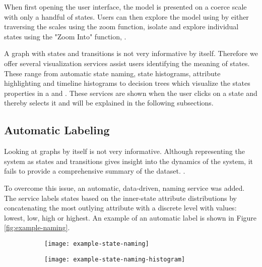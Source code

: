 When first opening the user interface, the model is presented on a coerce scale with only a handful
of states. Users can then explore the model using by either traversing the scales using the zoom 
function, isolate and explore individual states using the "Zoom Into" function, .

A graph with states and transitions is not very informative by itself. Therefore we offer several 
visualization services assist users identifying the meaning of states. These range from automatic
state naming, state histograms, attribute highlighting and timeline histograms to decision trees
which visualize the states properties in a  and .
These services are shown when the user clicks on a state and thereby selects it and will be 
explained in the following subsections.

\subsection{Automatic Labeling}

Looking at graphs by itself is not very informative. Although representing the system as states and 
transitions gives insight into the dynamics of the system, it fails to provide a comprehensive summary 
of the dataset. .

To overcome this issue, an automatic, data-driven, naming service was added. The service labels
states based on the inner-state attribute distributions by concatenating the most outlying attribute
with a discrete level with values: lowest, low, high or highest. An example of an automatic label
is shown in Figure \ref{fig:example-naming}.

\begin{figure}[h!]
	\centering
	\label{fig:example-naming}
	\begin{subfigure}{.48\columnwidth}
	  	\centering
	  	\texttt{[image: example-state-naming]}
  		\caption{}
  		\label{fig:example-naming-label}
	\end{subfigure}
	\begin{subfigure}{.48\columnwidth}
	  	\centering
	  	\texttt{[image: example-state-naming-histogram]}
	  	\caption{}
	  	\label{fig:example-naming-histogram}
	\end{subfigure}
\end{figure}


